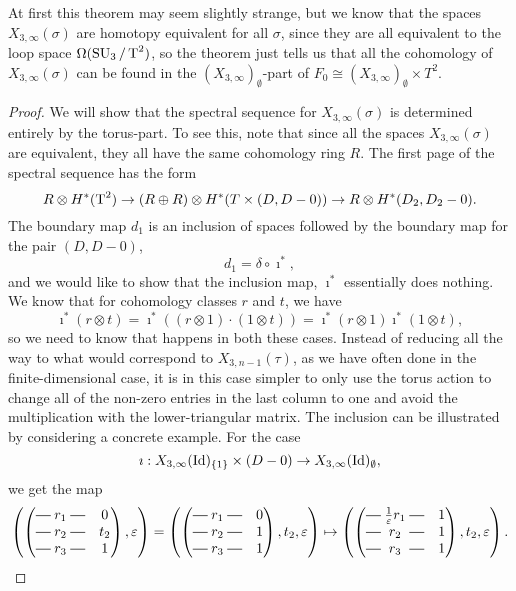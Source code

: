 At first this theorem may seem slightly strange, but we know
that the spaces $X_{3,\infty}(\sigma)$ are homotopy equivalent for all
$\sigma$, since they are all equivalent to the loop space
$\Omega(\operatorname{SU}_3/\operatorname{T}^2)$, so the theorem
just tells us that all the cohomology of $X_{3,\infty}(\sigma)$ can be
found in the $(X_{3,\infty})_{\emptyset}$-part of $F_0 \cong
(X_{3,\infty})_{\emptyset}\times T^2$.

\begin{proof}
  We will show that the spectral sequence for $X_{3,\infty}(\sigma)$
  is determined entirely by the torus-part. To see this, note that
  since all the spaces $X_{3,\infty}(\sigma)$ are equivalent, they all
  have the same cohomology ring $R$. The first page of the spectral
  sequence has the form
  \[ R \otimes H^*(\operatorname{T}^2) \to (R\oplus R)\otimes H^*(T\times (D,D-0))
  \to R\otimes H^*(D_2,D_2-0). \]
  The boundary map $d_1$ is an inclusion of spaces
  followed by the boundary map for the pair $(D,D-0)$,
  \[ d_1 = \delta \circ \imath^*, \]
  and we would like to show that the inclusion map, $\imath^*$
  essentially does nothing. We know that for cohomology classes $r$
  and $t$, we have
  \[ \imath^*(r \otimes t) = \imath^*((r\otimes 1)\cdot (1\otimes t))
  = \imath^*(r\otimes 1) \imath^*(1\otimes t), \]
  so we need to know that happens in both these cases. Instead of
  reducing all the way to what would correspond to $X_{3,n-1}(\tau)$,
  as we have often done in the finite-dimensional case, it is in this
  case simpler to only use
  the torus action to change all of
  the non-zero entries in the last column to one and avoid the
  multiplication with the lower-triangular matrix. The inclusion
  can be illustrated by considering a concrete example. For the
  case
  \[\imath : X_{3,\infty}(\operatorname{Id})_{\left\{ 1 \right\}}\times(D-0) \to
  X_{3,\infty}(\operatorname{Id})_{\emptyset}, \]
  we get the map
  \[ \left(\begin{pmatrix}
      \matrow{r_1} & 0   \\
      \matrow{r_2} & t_2 \\
      \matrow{r_3} & 1
    \end{pmatrix},\varepsilon\right) =
  \left(\begin{pmatrix}
      \matrow{r_1} & 0 \\
      \matrow{r_2} & 1 \\
      \matrow{r_3} & 1
    \end{pmatrix}, t_2, \varepsilon\right) \mapsto
  \left(\begin{pmatrix}
      \matrow{\frac{1}{\varepsilon}r_1} & 1 \\
      \matrow{r_2} & 1 \\
      \matrow{r_3} & 1
    \end{pmatrix}, t_2,\varepsilon\right). \]
  

\end{proof}

